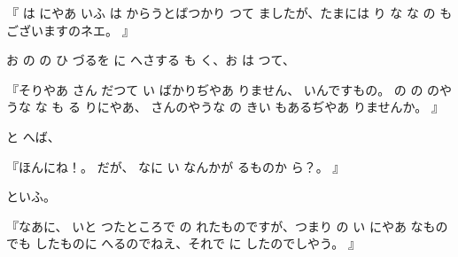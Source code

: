 
『
は
にやあ
いふ
は
からうとばつかり
つて
ましたが、たまには
り
な
な
の
もございますのネエ。
』

お
の
の
ひ
づるを
に
へさする
も
く、お
は
つて、

『そりやあ
さん
だつて
い
ばかりぢやあ
りません、
いんですもの。
の
の
のやうな
な
も
る
りにやあ、
さんのやうな
の
きい
もあるぢやあ
りませんか。
』

と
へば、

『ほんにね！。
だが、
なに
い
なんかが
るものか
ら？。
』

といふ。

『なあに、
いと
つたところで
の
れたものですが、つまり
の
い
にやあ
なものでも
したものに
へるのでねえ、それで
に
したのでしやう。
』

